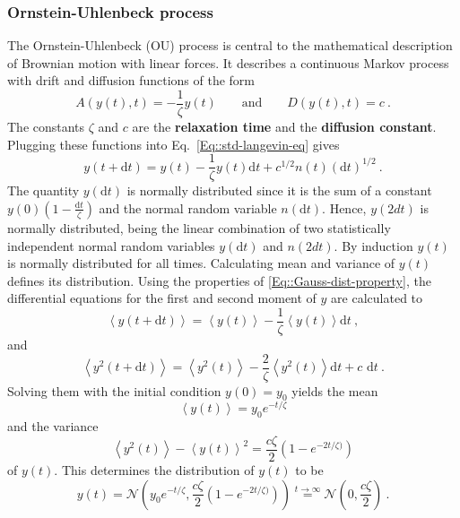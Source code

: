 	\subsubsection{Ornstein-Uhlenbeck process}
	The Ornstein-Uhlenbeck (OU) process is central to the mathematical description of Brownian motion with linear forces. It describes a continuous Markov process with drift and diffusion functions of the form
	\begin{equation}
		A(y(t), t) =	- \frac{1}{\zeta} y(t) \qquad \text{and} \qquad D(y(t), t) =	c~.
	\end{equation}
	The constants $\zeta$ and $c$ are the \textbf{relaxation time} and the \textbf{diffusion constant}. Plugging these functions into Eq.~\eqref{Eq::std-langevin-eq} gives
	\begin{equation}\label{Eq::OU-Langevin}
		y(t + \text{d}t) =	y(t) - \frac{1}{\zeta} y(t) \text{d}t + c^{1/2} n(t) (\text{d}t)^{1/2}~.
	\end{equation}
	The quantity $y(\text{d}t)$ is normally distributed since it is the sum of a constant $y(0) (1 - \frac{\text{d}t}{\zeta})$ and the normal random variable $n(\text{d}t)$. Hence, $y(2dt)$ is normally distributed, being the linear combination of two statistically independent normal random variables $y(\text{d}t)$ and $n(2dt)$. By induction $y(t)$ is normally distributed for all times. Calculating mean and variance of $y(t)$ defines its distribution.
	Using the properties of \autoref{Eq::Gauss-dist-property}, the differential equations for the first and second moment of $y$ are calculated to
	\begin{equation}
		\left \langle y(t + \text{d}t) \right \rangle =	\left \langle y(t) \right \rangle - \frac{1}{\zeta} \left \langle y(t) \right \rangle \text{d}t~,
	\end{equation}
	and
	\begin{equation}
		\left \langle y^2(t + \text{d}t) \right \rangle =	\left \langle y^2(t) \right \rangle - \frac{2}{\zeta} \left \langle y^2(t) \right \rangle \text{d}t  + c \text{ d}t~.
	\end{equation}
	Solving them with the initial condition $y(0) =	y_0$ yields the mean
	\begin{equation}
		\left \langle y(t) \right \rangle =	 y_0 e^{-t/\zeta}
	\end{equation}
	and the variance
	\begin{equation}
		\left \langle y^2(t) \right \rangle - \left \langle y(t) \right \rangle^2 =	\frac{c\zeta}{2} \left(1 - e^{-2t /	\zeta)}\right)
	\end{equation}
	of $y(t)$. This determines the distribution of $y(t)$ to be
	\begin{equation} \label{Eq::OU-Distribution}
		y(t) =	\mathcal{N}\left(y_0 e^{-t/\zeta}, \frac{c\zeta}{2} \left(1 - e^{-2t /	\zeta)}\right)\right) \overset{t \rightarrow \infty}{=} \mathcal{N}\left(0 , \frac{c\zeta}{2}\right) ~.
	\end{equation}
